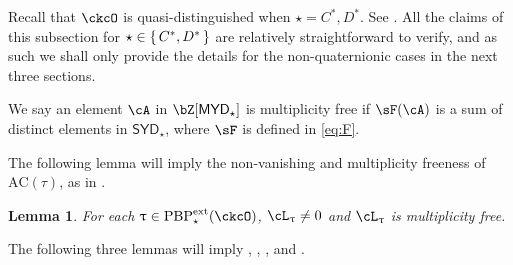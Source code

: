 \documentclass[12pt,a4paper]{amsart}
\newcommand{\AC}{\mathrm{AC}}
\def\SYD{{\mathsf{SYD}}}
\def\MYD{{\mathsf{MYD}}}
\numberwithin{equation}{section}
\newtheorem{lem}[thm]{Lemma}
\theoremstyle{remark}
\def\PBPes{\mathrm{PBP}^{\mathrm{ext}}_{\star}}
\begin{document}
Recall that $\ckcO$ is quasi-distinguished when $\star = C^*, D^*$. See . All the claims of this subsection for $\star\in \set{C^{*},D^{*}}$ are relatively straightforward to verify, and as such we shall only provide the details for the non-quaternionic cases in the next three sections.

\smallskip 


We say an element $\cA$ in $\bZ[\MYD_\star]$ is multiplicity free if $\sF(\cA)$ is a sum of
distinct elements in $\SYD_\star$, where $\sF$ is defined in \eqref{eq:F}.

The following lemma will imply the non-vanishing and multiplicity freeness of
$\AC(\tau)$, as in .

\begin{lem}\label{lem:ac0}
  For each $\uptau\in \PBPes(\ckcO)$,
  $\ac_{\uptau}\neq 0$ and $\ac_\uptau$ is multiplicity free.
\end{lem}

\smallskip

The following three lemmas will imply , , , and
. 
\end{document}
